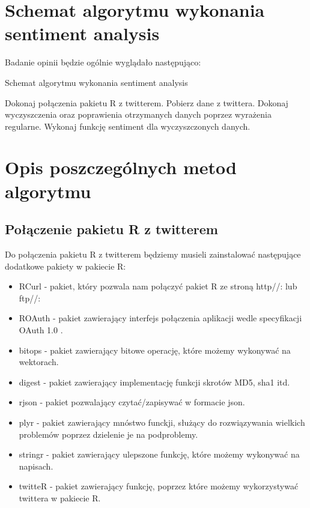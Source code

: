 \documentclass[12pt,a4paper]{article}
\begin{document}
\section[Schemat algorytmu wykonania sentiment analysis] {Schemat algorytmu wykonania sentiment analysis}
Badanie opinii będzie ogólnie wyglądało następująco: \\

\begin{algorithm}
\caption{Schemat algorytmu wykonania sentiment analysis}
\begin{algorithmic}[1]

    \State Dokonaj połączenia pakietu R z twitterem.
    \State Pobierz dane z twittera.
    \State Dokonaj wyczyszczenia oraz poprawienia otrzymanych danych poprzez wyrażenia regularne.
    \State Wykonaj funkcję sentiment dla wyczyszczonych danych.
\EndProcedure
\end{algorithmic}
\end{algorithm}

\section[Opis poszczególnych metod algorytmu]{Opis poszczególnych metod algorytmu}
\subsection[Połączenie pakietu R z twitterem] {Połączenie pakietu R z twitterem}
Do połączenia pakietu R z twitterem będziemy musieli zainstalować następujące dodatkowe pakiety w pakiecie R: 
\begin{itemize}
\item RCurl - pakiet, który pozwala nam połączyć pakiet R ze stroną http//: lub ftp//:
\item ROAuth - pakiet zawierający interfejs połączenia aplikacji wedle specyfikacji OAuth 1.0 .
\item bitops - pakiet zawierający bitowe operację, które możemy wykonywać na wektorach.
\item digest - pakiet zawierający implementację funkcji skrotów MD5, sha1 itd. 
\item rjson - pakiet pozwalający czytać/zapisywać w formacie json. 
\item plyr - pakiet zawierający mnóstwo funckji, służący do rozwiązywania wielkich problemów poprzez dzielenie je na podproblemy. 
\item stringr - pakiet zawierający ulepszone funkcję, które możemy wykonywać na napisach.
\item twitteR - pakiet zawierający funkcję, poprzez które możemy wykorzystywać twittera w pakiecie R.
\end{itemize}
\end{document}
